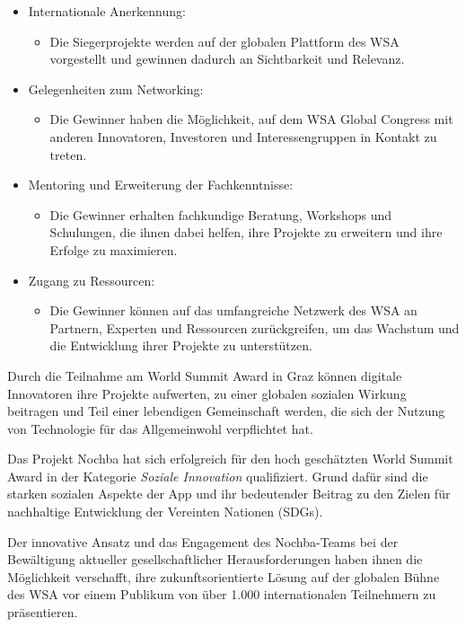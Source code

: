 \begin{itemize}
    \item {Internationale Anerkennung:}
          \begin{itemize}
              \item {Die Siegerprojekte werden auf der globalen Plattform des WSA vorgestellt und gewinnen dadurch an Sichtbarkeit und Relevanz.}
          \end{itemize}
    \item {Gelegenheiten zum Networking:}
          \begin{itemize}
              \item {Die Gewinner haben die Möglichkeit, auf dem WSA Global Congress mit anderen Innovatoren, Investoren und Interessengruppen in Kontakt zu treten.}
          \end{itemize}
    \item {Mentoring und Erweiterung der Fachkenntnisse:}
          \begin{itemize}
              \item {Die Gewinner erhalten fachkundige Beratung, Workshops und Schulungen, die ihnen dabei helfen, ihre Projekte zu erweitern und ihre Erfolge zu maximieren.}
          \end{itemize}
    \item {Zugang zu Ressourcen:}
          \begin{itemize}
              \item {Die Gewinner können auf das umfangreiche Netzwerk des WSA an Partnern, Experten und Ressourcen zurückgreifen, um das Wachstum und die Entwicklung ihrer Projekte zu unterstützen.}
          \end{itemize}
\end{itemize}

Durch die Teilnahme am World Summit Award in Graz können digitale Innovatoren ihre Projekte aufwerten, zu einer globalen sozialen Wirkung beitragen und Teil einer lebendigen Gemeinschaft werden, die sich der Nutzung von Technologie für das Allgemeinwohl verpflichtet hat.

Das Projekt Nochba hat sich erfolgreich für den hoch geschätzten World Summit Award in der Kategorie \textit{Soziale Innovation} qualifiziert. Grund dafür sind die starken sozialen Aspekte der App und ihr bedeutender Beitrag zu den Zielen für nachhaltige Entwicklung der Vereinten Nationen (SDGs).

Der innovative Ansatz und das Engagement des Nochba-Teams bei der Bewältigung aktueller gesellschaftlicher Herausforderungen haben ihnen die Möglichkeit verschafft, ihre zukunftsorientierte Lösung auf der globalen Bühne des WSA vor einem Publikum von über 1.000 internationalen Teilnehmern zu präsentieren.


